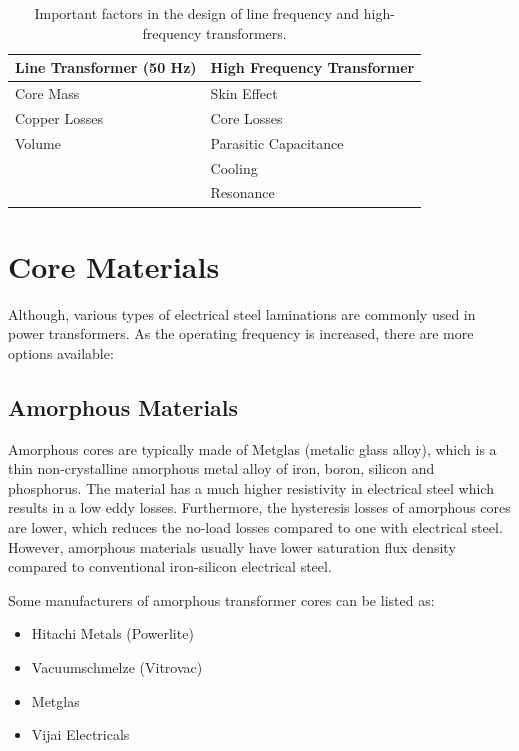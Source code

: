 \documentclass[a4paper, 11pt]{article} %
\begin{document}
\begin{table}[]
\begin{center}
\begin{tabular}{ll}
Line Transformer (50 Hz) & High Frequency Transformer\\
\hline
Core Mass & Skin Effect\\
Copper Losses & Core Losses\\
Volume & Parasitic Capacitance\\
& Cooling \\
& Resonance \\
\hline
\end{tabular} 
\end{center}
\caption{Important factors in the design of line frequency and high-frequency transformers.}
\label{important}
\end{table}


\section{Core Materials}

Although, various types of electrical steel laminations are commonly used in power transformers. As the operating frequency is increased, there are more options available:

\subsection*{Amorphous Materials}

Amorphous cores are typically made of Metglas (metalic glass alloy), which is a thin non-crystalline amorphous metal alloy of iron, boron, silicon and phosphorus. The material has a much higher resistivity in electrical steel which results in a low eddy losses. Furthermore, the hysteresis losses of amorphous cores are lower, which reduces the no-load losses compared to one with electrical steel. However, amorphous materials usually have lower saturation flux density compared to conventional iron-silicon electrical steel.

Some manufacturers of amorphous transformer cores can be listed as:

\begin{itemize}
  \item Hitachi Metals (Powerlite)
  \item Vacuumschmelze (Vitrovac)
  \item Metglas
  \item Vijai Electricals
\end{itemize}
\end{document}
